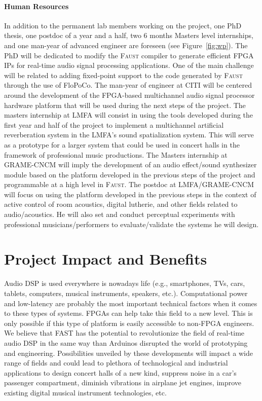 \documentclass[a4paper,10pt]{article}
\newcommand{\F}{\textsc{Faust}}
\newcommand{\PP}{FAST}
\begin{document}
\paragraph{Human Resources}

In addition to the permanent lab members working on the project, one PhD thesis, one postdoc of a year and a half, two 6 months Masters level internships, and one man-year of advanced engineer are foreseen (see Figure~\ref{fig:wp}). The PhD will be dedicated to modify the \F{} compiler to generate efficient FPGA IPs for real-time audio signal processing applications. One of the main challenge will be related to adding fixed-point support to the code generated by \F{} through the use of FloPoCo. The man-year of engineer at CITI will be centered around the development of the FPGA-based multichannel audio signal processor hardware platform that will be used during the next steps of the project. The masters internship at LMFA will consist in using the tools developed during the first year and half of the project to implement a multichannel artificial reverberation system in the LMFA's sound spatialization system. This will serve as a prototype for a larger system that could be used in concert halls in the framework of professional music productions. The Masters internship at GRAME-CNCM will imply the development of an audio effect/sound synthesizer module based on the platform developed in the previous steps of the project and programmable at a high level in \F{}. The postdoc at LMFA/GRAME-CNCM will focus on using the platform developed in the previous steps in the context of active control of room acoustics, digital lutherie, and other fields related to audio/acoustics. He will also set and conduct perceptual experiments with professional musicians/performers to evaluate/validate the systems he will design. 


\section*{Project Impact and Benefits}

Audio DSP is used everywhere is nowadays life (e.g., smartphones, TVs, cars, tablets, computers, musical instruments, speakers, etc.). Computational power and low-latency are probably the most important technical factors when it comes to these types of systems. FPGAs can help take this field to a new level. This is only possible if this type of platform is easily accessible to non-FPGA engineers. We believe that \PP{} has the potential to revolutionize the field of real-time audio DSP in the same way than Arduinos disrupted the world of prototyping and engineering. %
Possibilities unveiled by these developments will impact a wide range of fields and could lead to plethora of technological and industrial applications to design concert halls of a new kind, suppress noise in a car's passenger compartment, diminish vibrations in airplane jet engines, improve existing digital musical instrument technologies, etc. 
\end{document}
